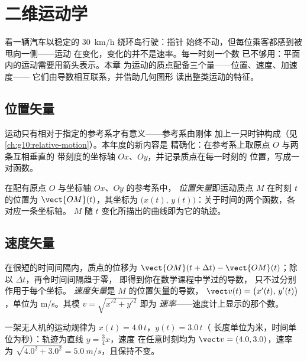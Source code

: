 \chapter{二维运动学}\label{ch:g12:kinematics-2d}

看一辆汽车以稳定的 \qty{30}{km/h} 绕环岛行驶：指针
始终不动，但每位乘客都感到被甩向一侧——运动
在变化，变化的并不是速率。每一时刻一个数
已不够用：平面内的运动需要用箭头表示。本章
为运动的质点配备三个量——位置、速度、加速度——
它们由导数相互联系，并借助几何图形
读出整类运动的特征。

\section{位置矢量}

运动只有相对于指定的参考系才有意义——参考系由刚体
加上一只时钟构成（见\cref{ch:g10:relative-motion}）。本年度的新内容是
精确化：在参考系上取原点 $O$ 与两条互相垂直的
带刻度的坐标轴 $Ox$、$Oy$，并记录质点在每一时刻的
位置，写成一对函数。

\begin{definition}[位置矢量]\label{def:g12:kinematics-2d:position}
在配有原点 $O$ 与坐标轴 $Ox$、$Oy$ 的参考系中，
\emph{位置矢量}即运动质点 $M$
在时刻 $t$ 的位置为 $\vect{OM}(t)$，其坐标为
$\bigl(x(t),\, y(t)\bigr)$：关于时间的两个函数，各对应一条坐标轴。
$M$ 随 $t$ 变化所描出的曲线即为它的轨迹。
\end{definition}

\section{速度矢量}

\begin{definition}[速度矢量]\label{def:g12:kinematics-2d:velocity}
在很短的时间间隔内，质点的位移为
$\vect{OM}(t+\Delta t) - \vect{OM}(t)$；除以 $\Delta t$，再令时间间隔趋于零，
即得到你在数学课程中学过的导数，
只不过分别作用于每个坐标。
\emph{速度矢量}是 $M$ 的位置矢量的导数，
$\vect v(t) = \bigl(x'(t),\, y'(t)\bigr)$，单位为
\unit{m/s}。其模 $v = \sqrt{x'^2 + y'^2}$ 即为
\emph{速率}——速度计上显示的那个数。
\end{definition}

\begin{example}[无人机的水平飞行]\label{ex:g12:kinematics-2d:drone}
一架无人机的运动规律为 $x(t) = 4.0\,t$，$y(t) = 3.0\,t$（
长度单位为米，时间单位为秒）：轨迹为直线 $y = \tfrac34 x$，速度
在任意时刻均为 $\vect v = (4.0, 3.0)$，速率
为 $\sqrt{4.0^2 + 3.0^2} = \qty{5.0}{m/s}$，且保持不变。
\end{example}

